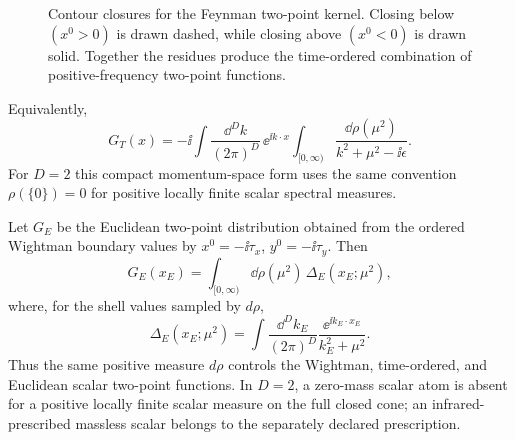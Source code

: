 \begin{figure}[H]
\centering
{}
\caption{Contour closures for the Feynman two-point kernel.  Closing below
\((x^0>0)\) is drawn dashed, while closing above \((x^0<0)\) is drawn solid.
Together the residues produce the time-ordered combination of
positive-frequency two-point functions.}
\label{fig:kallen-lehmann-feynman-contour-closures}
\end{figure}

Equivalently,
\[
  G_T(x)
  =
  -\ii
  \int\frac{\dd^Dk}{(2\pi)^D}\,
  \ee^{\ii k\cdot x}
  \int_{[0,\infty)}
  \frac{\dd\rho(\mu^2)}{k^2+\mu^2-\ii\epsilon}.
\]
For \(D=2\) this compact momentum-space form uses the same convention
\(\rho(\{0\})=0\) for positive locally finite scalar spectral measures.

\begin{proposition}
\label{prop:kallen-lehmann-euclidean-representation}
Let \(G_E\) be the Euclidean two-point distribution obtained from the ordered
Wightman boundary values by \(x^0=-\ii\tau_x\),
\(y^0=-\ii\tau_y\).  Then
\[
  G_E(x_E)
  =
  \int_{[0,\infty)}
  \dd\rho(\mu^2)\,
  \Delta_E(x_E;\mu^2),
\]
where, for the shell values sampled by \(d\rho\),
\begin{equation}
  \Delta_E(x_E;\mu^2)
  =
  \int\frac{\dd^Dk_E}{(2\pi)^D}
  \frac{\ee^{\ii k_E\cdot x_E}}{k_E^2+\mu^2}.
  \label{eq:kallen-lehmann-free-euclidean-kernel}
\end{equation}
Thus the same positive measure \(d\rho\) controls the Wightman,
time-ordered, and Euclidean scalar two-point functions.  In \(D=2\), a
zero-mass scalar atom is absent for a positive locally finite scalar measure on
the full closed cone; an infrared-prescribed massless scalar belongs to the
separately declared prescription.
\end{proposition}

